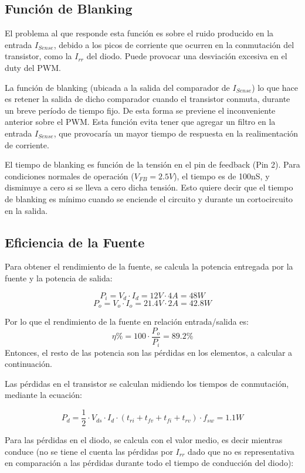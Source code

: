 \documentclass[e4_tp2_main.tex]{subfiles}
\begin{document}
\subsection{Función de Blanking}

El problema al que responde esta función es sobre el ruido producido en la entrada $I_{Sense}$, debido a los picos de corriente que ocurren en la conmutación del transistor, como la $I_{rr}$ del diodo. Puede provocar una desviación excesiva en el duty del PWM.\par
La función de blanking (ubicada a la salida del comparador de $I_{Sense}$) lo que hace es retener la salida de dicho comparador cuando el transistor conmuta, durante un breve período de tiempo fijo. De esta forma se previene el inconveniente anterior sobre el PWM. Esta función evita tener que agregar un filtro en la entrada $I_{Sense}$, que provocaría un mayor tiempo de respuesta en la realimentación de corriente.\par
El tiempo de blanking es función de la tensión en el pin de feedback (Pin 2). Para condiciones normales de operación ($V_{FB} = 2.5V$), el tiempo es de 100nS, y disminuye a cero si se lleva a cero dicha tensión. Esto quiere decir que el tiempo de blanking es mínimo cuando se enciende el circuito y durante un cortocircuito en la salida. 

\newpage

\subsection{Eficiencia de la Fuente}
Para obtener el rendimiento de la fuente, se calcula la potencia entregada por la fuente y la potencia de salida:

\[
P_i = V_d \cdot I_d = 12V \cdot 4A = 48W  
\]
\[
P_o = V_o \cdot I_o = 21.4V \cdot 2A = 42.8W
\]

Por lo que el rendimiento de la fuente en relación entrada/salida es:
\[
\eta \% = 100 \cdot \frac{P_o}{P_i} = 89.2 \%
\]
Entonces, el resto de las potencia son las pérdidas en los elementos, a calcular a continuación.\par

Las pérdidas en el transistor se calculan midiendo los tiempos de conmutación, mediante la ecuación:

\[
P_d = \frac{1}{2} \cdot V_{ds} \cdot I_d \cdot (t_{ri} + t_{fv} + t_{fi} + t_{rv}) \cdot f_{sw} = 1.1W
\]

Para las pérdidas en el diodo, se calcula con el valor medio, es decir mientras conduce (no se tiene el cuenta las pérdidas por $I_{rr}$ dado que no es representativa en comparación a las pérdidas durante todo el tiempo de conducción del diodo):
\end{document}
